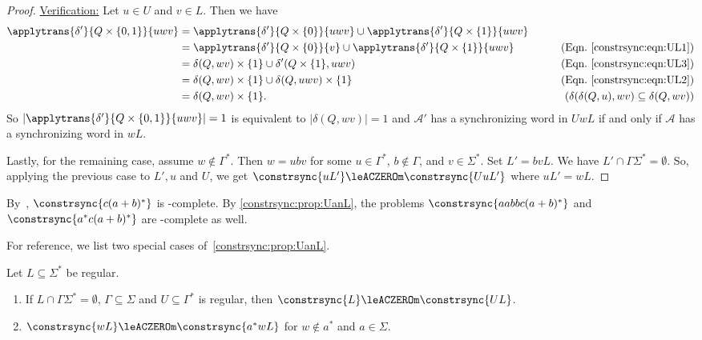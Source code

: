 \begin{proof}
	\noindent\underline{Verification:} Let $u \in U$ and $v \in L$.
	Then we have
	\begin{align*}
		\applytrans{\delta'}{Q \times \{0,1\}}{uwv} 
		& = \applytrans{\delta'}{Q \times \{0\}}{uwv} \cup \applytrans{\delta'}{Q \times \{1\}}{uwv} \\
		& = \applytrans{\delta'}{Q \times \{0\}}{v} \cup \applytrans{\delta'}{Q \times \{1\}}{uwv} & \tag{Eqn.~\eqref{constrsync:eqn:UL1}} \\
		& = \delta(Q, wv) \times \{1\} \cup \delta'(Q \times \{1\}, uwv) & \tag{Eqn.~\eqref{constrsync:eqn:UL3}} \\
		& = \delta(Q, wv) \times \{1\} \cup \delta(Q, uwv) \times \{1\} & \tag{Eqn.~\eqref{constrsync:eqn:UL2}} \\
		& = \delta(Q, wv)  \times \{1\}.                                   & \tag{$\delta(\delta(Q, u), wv) \subseteq  \delta(Q, wv)$}
	\end{align*}
	So $|\applytrans{\delta'}{Q \times \{0,1\}}{uwv}| = 1$
	is equivalent to $|\delta(Q,wv)| = 1$
	and $\mathcal A'$ has a synchronizing word in $UwL$
	if and only if $\mathcal A$ has a synchronizing word in $wL$.
	
    \medskip 
    
    Lastly, for the remaining case, assume $w \notin \Gamma^*$.
    Then $w = ubv$  for some $u \in \Gamma^*$, $b \notin \Gamma$, and $v \in \Sigma^*$.
    Set $L' = bvL$. We have $L' \cap \Gamma\Sigma^* = \emptyset$. 
    So, applying the previous case to $L', u$ and $U$,
    we get 
    $\constrsync{uL'} \leACZEROm \constrsync{UuL'}$
    where $uL' = wL$.
\end{proof}             

\begin{example}\label{constrsync:ex:PSPACEhard}
	By~,
	$\constrsync{c(a+b)^*}$	is \PSPACE-complete.
	By \cref{constrsync:prop:UanL}, the problems
	$\constrsync{aabbc(a+b)^*}$ and $\constrsync{a^*c(a+b)^*}$
	are \PSPACE-complete as well.
\end{example}

For reference, we list two special cases  of~\cref{constrsync:prop:UanL}.

\begin{corollary}
	\label{constrsync:cor:UanL}
	Let $L \subseteq \Sigma^*$ be regular.
	
	\begin{enumerate}
		\item \label{constrsync:cor:UanL:1} If $L \cap \Gamma\Sigma^* = \emptyset$,
		$\Gamma \subseteq \Sigma$ and $U \subseteq \Gamma^*$ is regular, then $\constrsync{L} \leACZEROm \constrsync{UL}$. 
		
		\item \label{constrsync:cor:UanL:2} $\constrsync{wL} \leACZEROm \constrsync{a^*wL}$	for $w \notin a^*$ and $a \in \Sigma$.
	\end{enumerate}
\end{corollary}                    

